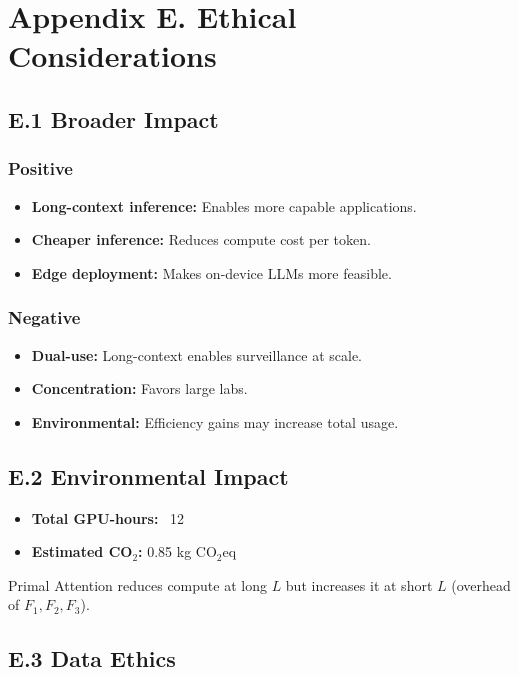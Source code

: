 
\section{Appendix E. Ethical Considerations}

\subsection{E.1 Broader Impact}

\subsubsection{Positive}
\begin{itemize}
\item \textbf{Long-context inference:} Enables more capable applications.
\item \textbf{Cheaper inference:} Reduces compute cost per token.
\item \textbf{Edge deployment:} Makes on-device LLMs more feasible.

\end{itemize}
\subsubsection{Negative}
\begin{itemize}
\item \textbf{Dual-use:} Long-context enables surveillance at scale.
\item \textbf{Concentration:} Favors large labs.
\item \textbf{Environmental:} Efficiency gains may increase total usage.

\end{itemize}
\subsection{E.2 Environmental Impact}

\begin{itemize}
\item \textbf{Total GPU-hours:} ~12
\item \textbf{Estimated CO$_2$:} 0.85 kg CO$_2$eq

\end{itemize}
Primal Attention reduces compute at long $L$ but increases it at short $L$ 
(overhead of $F_1, F_2, F_3$).

\subsection{E.3 Data Ethics}

